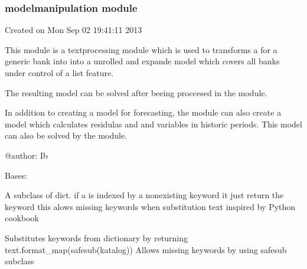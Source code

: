 \documentclass[letterpaper,10pt,english]{sphinxmanual}
\begin{document}
\subsubsection{modelmanipulation module}
\label{\detokenize{onboard/modelmanipulation:module-modelmanipulation}}\label{\detokenize{onboard/modelmanipulation:modelmanipulation-module}}\label{\detokenize{onboard/modelmanipulation::doc}}
\sphinxAtStartPar
Created on Mon Sep 02 19:41:11 2013

\sphinxAtStartPar
This module is a textprocessing module which is used to transforms a  for a generic bank into into a unrolled and
expande model which covers all banks \sphinxhyphen{} under  control of a list feature.

\sphinxAtStartPar
The resulting model can be solved after beeing proccesed in the  module.

\sphinxAtStartPar
In addition to creating a model for forecasting, the module can also create a model which calculates residulas and and variables
in historic periods.  This model can also be solved by the  module.

\sphinxAtStartPar
@author: Ib

\begin{fulllineitems}
\label{\detokenize{onboard/modelmanipulation:modelmanipulation.safesub}}
\pysigstartsignatures
{}
\pysigstopsignatures
\sphinxAtStartPar
Bases: 

\sphinxAtStartPar
A subclass of dict.
if a  is indexed by a nonexisting keyword it just return the keyword
this alows missing keywords when substitution text inspired by Python cookbook

\end{fulllineitems}


\begin{fulllineitems}
\label{\detokenize{onboard/modelmanipulation:modelmanipulation.sub}}
\pysigstartsignatures
{}
\pysigstopsignatures
\sphinxAtStartPar
Substitutes keywords from dictionary by returning
text.format\_map(safesub(katalog))
Allows missing keywords by using safesub subclass

\end{fulllineitems}
\end{document}
